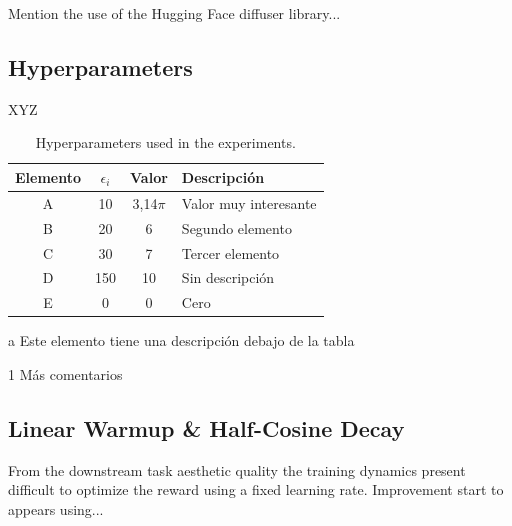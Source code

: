 \begin{appendixs}
    Mention the use of the Hugging Face diffuser library...

    \subsection{Hyperparameters}

    XYZ

	\enabletablerowcolor[2] %
	\begin{table}[H]
		\begin{threeparttable}
		\centering
		\caption{Hyperparameters used in the experiments.}
		\begin{tabular}{cccC{4cm}}
			\hline
			\textbf{Elemento} & $\epsilon_i$ & \textbf{Valor} & \textbf{Descripción} \bigstrut \\
			\hline
			A     & 10    & 3,14$\pi$ & Valor muy interesante \\
			B     & 20    & 6 & Segundo elemento \\
			C     & 30    & 7 & Tercer elemento \\
			D     & 150    & 10 & Sin descripción \\
			E     & 0    & 0 & Cero \\
			\hline
			\end{tabular}
		\begin{tablenotes}
			\item[a] Este elemento tiene una descripción debajo de la tabla
			\item[1] Más comentarios
		\end{tablenotes}
		\end{threeparttable}
		\label{tab:anexo-1}
	\end{table}
	\disabletablerowcolor %

    \subsection{Linear Warmup \& Half-Cosine Decay}

    From the downstream task aesthetic quality the training dynamics present difficult to optimize the reward using a fixed learning rate. Improvement start to appears using...%



\end{appendixs}